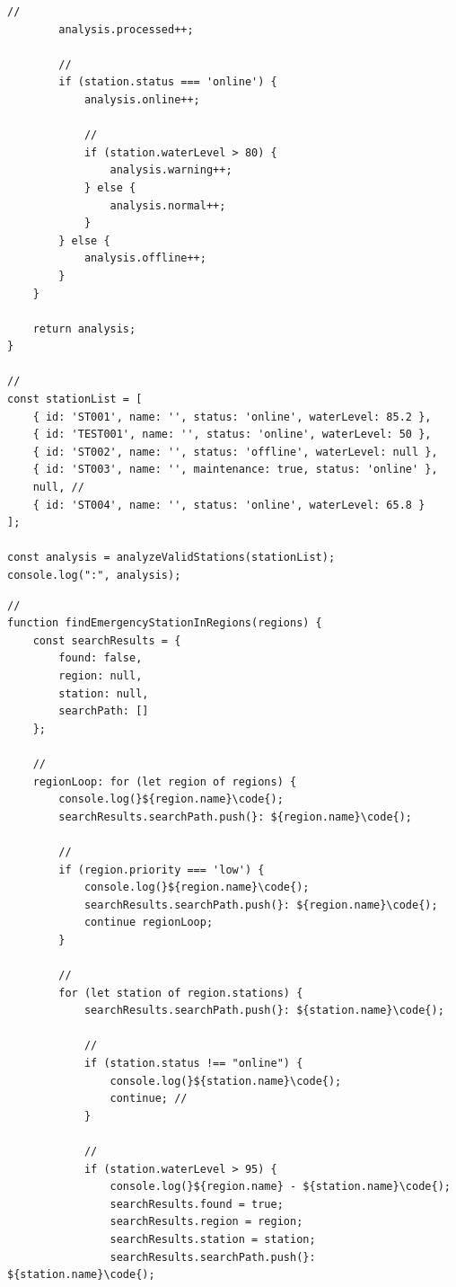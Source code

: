 {\begin{lstlisting}[style=javascript]
        // 
        analysis.processed++;
        
        // 
        if (station.status === 'online') {
            analysis.online++;
            
            // 
            if (station.waterLevel > 80) {
                analysis.warning++;
            } else {
                analysis.normal++;
            }
        } else {
            analysis.offline++;
        }
    }
    
    return analysis;
}

// 
const stationList = [
    { id: 'ST001', name: '', status: 'online', waterLevel: 85.2 },
    { id: 'TEST001', name: '', status: 'online', waterLevel: 50 },
    { id: 'ST002', name: '', status: 'offline', waterLevel: null },
    { id: 'ST003', name: '', maintenance: true, status: 'online' },
    null, // 
    { id: 'ST004', name: '', status: 'online', waterLevel: 65.8 }
];

const analysis = analyzeValidStations(stationList);
console.log(":", analysis);
\end{lstlisting}


\begin{lstlisting}[style=javascript]
// 
function findEmergencyStationInRegions(regions) {
    const searchResults = {
        found: false,
        region: null,
        station: null,
        searchPath: []
    };
    
    // 
    regionLoop: for (let region of regions) {
        console.log(}${region.name}\code{);
        searchResults.searchPath.push(}: ${region.name}\code{);
        
        // 
        if (region.priority === 'low') {
            console.log(}${region.name}\code{);
            searchResults.searchPath.push(}: ${region.name}\code{);
            continue regionLoop;
        }
        
        // 
        for (let station of region.stations) {
            searchResults.searchPath.push(}: ${station.name}\code{);
            
            // 
            if (station.status !== "online") {
                console.log(}${station.name}\code{);
                continue; // 
            }
            
            // 
            if (station.waterLevel > 95) {
                console.log(}${region.name} - ${station.name}\code{);
                searchResults.found = true;
                searchResults.region = region;
                searchResults.station = station;
                searchResults.searchPath.push(}: ${station.name}\code{);
                

\end{lstlisting}}
